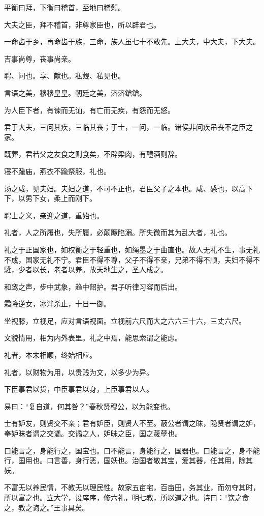 \documentclass[]{article}
\begin{document}
平衡曰拜，下衡曰稽首，至地曰稽颡。

大夫之臣，拜不稽首，非尊家臣也，所以辟君也。

一命齿于乡，再命齿于族，三命，族人虽七十不敢先。上大夫，中大夫，下大夫。

吉事尚尊，丧事尚亲。

聘、问也。享、献也。私觌、私见也。

言语之美，穆穆皇皇。朝廷之美，济济鎗鎗。

为人臣下者，有谏而无讪，有亡而无疾，有怨而无怒。

君于大夫，三问其疾，三临其丧；于士，一问，一临。诸侯非问疾吊丧不之臣之家。

既葬，君若父之友食之则食矣，不辟梁肉，有醴酒则辞。

寝不踰庙，燕衣不踰祭服，礼也。

汤之咸，见夫妇。夫妇之道，不可不正也，君臣父子之本也。咸、感也，以高下下，以男下女，柔上而刚下。

聘士之义，亲迎之道，重始也。

礼者，人之所履也，失所履，必颠蹶陷溺。所失微而其为乱大者，礼也。

礼之于正国家也，如权衡之于轻重也，如绳墨之于曲直也。故人无礼不生，事无礼不成，国家无礼不宁。君臣不得不尊，父子不得不亲，兄弟不得不顺，夫妇不得不驩，少者以长，老者以养。故天地生之，圣人成之。

和鸾之声，步中武象，趋中韶护。君子听律习容而后出。

霜降逆女，冰泮杀止，十日一御。

坐视膝，立视足，应对言语视面。立视前六尺而大之六六三十六，三丈六尺。

文貌情用，相为内外表里。礼之中焉，能思索谓之能虑。

礼者，本末相顺，终始相应。

礼者，以财物为用，以贵贱为文，以多少为异。

下臣事君以货，中臣事君以身，上臣事君以人。

易曰：``复自道，何其咎？''春秋贤穆公，以为能变也。

士有妒友，则贤交不亲；君有妒臣，则贤人不至。蔽公者谓之昧，隐贤者谓之妒，奉妒昧者谓之交谲。交谲之人，妒昧之臣，国之薉孽也。

口能言之，身能行之，国宝也。口不能言，身能行之，国器也。口能言之，身不能行，国用也。口言善，身行恶，国妖也。治国者敬其宝，爱其器，任其用，除其妖。

不富无以养民情，不教无以理民性。故家五亩宅，百亩田，务其业，而勿夺其时，所以富之也。立大学，设庠序，修六礼，明七教，所以道之也。诗曰：``饮之食之，教之诲之。''王事具矣。
\end{document}
